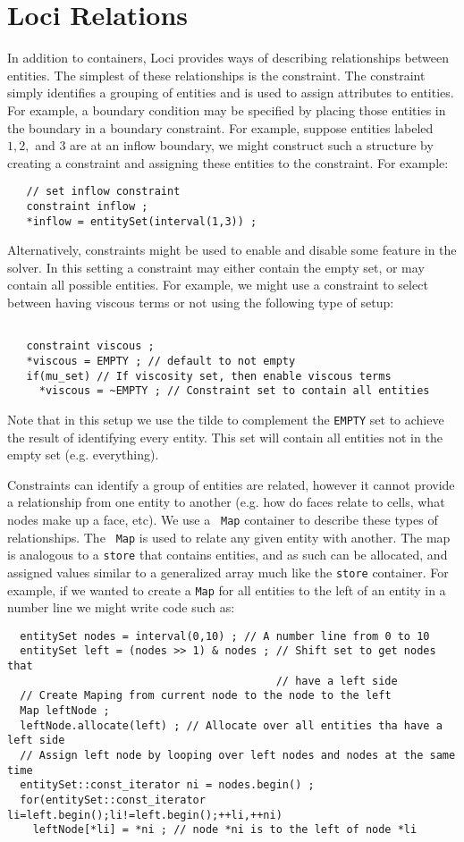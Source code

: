 \documentclass[10pt,epsf]{book}
\begin{document}
\section{Loci Relations}

In addition to containers, Loci provides ways of describing
relationships between entities.  The simplest of these relationships
is the constraint.  The constraint simply identifies a grouping of
entities and is used to assign attributes to entities.  For example, a
boundary condition may be specified by placing those entities in the
boundary in a boundary constraint.  For example, suppose entities
labeled $1,2,$ and $3$ are at an inflow boundary, we might construct
such a structure by creating a constraint and assigning these entities
to the constraint.  For example:
\begin{verbatim}
   // set inflow constraint
   constraint inflow ;
   *inflow = entitySet(interval(1,3)) ;
\end{verbatim}
Alternatively, constraints might be used to enable and disable some
feature in the solver.  In this setting a constraint may either
contain the empty set, or may contain all possible entities.  For
example, we might use a constraint to select between having viscous
terms or not using the following type of setup:
\begin{verbatim}

   constraint viscous ;
   *viscous = EMPTY ; // default to not empty 
   if(mu_set) // If viscosity set, then enable viscous terms
     *viscous = ~EMPTY ; // Constraint set to contain all entities
\end{verbatim}
Note that in this setup we use the tilde to complement the {\tt EMPTY} set
to achieve the result of identifying every entity.  This set will contain
all entities not in the empty set (e.g. everything).  

Constraints can identify a group of entities are related, however it
cannot provide a relationship from one entity to another (e.g. how do
faces relate to cells, what nodes make up a face, etc).  We use a {\tt
  Map} container to describe these types of relationships.  The {\tt
  Map} is used to relate any given entity with another.  The map is
analogous to a {\tt store} that contains entities, and as such can be
allocated, and assigned values similar to a generalized array much
like the {\tt store} container.  For example, if we wanted to create a {\tt Map} for all entities to the left of an entity in a number line we might write code such as:
\begin{verbatim}
  entitySet nodes = interval(0,10) ; // A number line from 0 to 10
  entitySet left = (nodes >> 1) & nodes ; // Shift set to get nodes that
                                          // have a left side
  // Create Maping from current node to the node to the left
  Map leftNode ;
  leftNode.allocate(left) ; // Allocate over all entities tha have a left side
  // Assign left node by looping over left nodes and nodes at the same time
  entitySet::const_iterator ni = nodes.begin() ;
  for(entitySet::const_iterator li=left.begin();li!=left.begin();++li,++ni)
    leftNode[*li] = *ni ; // node *ni is to the left of node *li
\end{verbatim}
\end{document}
